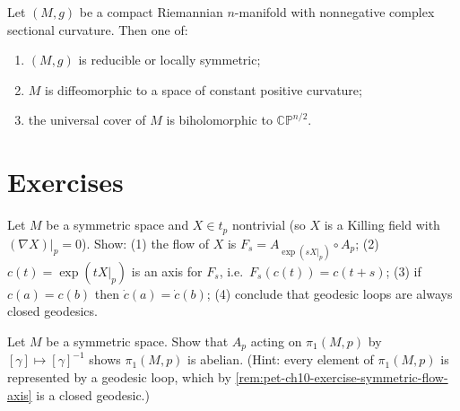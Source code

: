 \begin{theorem}
  \label{thm:pet-ch10-brendle-schoen}
  Let $(M,g)$ be a compact Riemannian $n$-manifold with nonnegative complex
  sectional curvature. Then one of:
  \begin{enumerate}
    \item[(a)] $(M,g)$ is reducible or locally symmetric;
    \item[(b)] $M$ is diffeomorphic to a space of constant positive curvature;
    \item[(c)] the universal cover of $M$ is biholomorphic to $\mathbb{CP}^{n/2}$.
  \end{enumerate}
\end{theorem}

\section{Exercises}

\begin{remark}
  \label{rem:pet-ch10-exercise-symmetric-flow-axis}
  Let $M$ be a symmetric space and $X\in t_p$ nontrivial (so $X$ is a Killing
  field with $(\nabla X)|_p=0$). Show: (1) the flow of $X$ is
  $F_s=A_{\exp(sX|_p)}\circ A_p$; (2) $c(t)=\exp(tX|_p)$ is an axis for $F_s$,
  i.e.\ $F_s(c(t))=c(t+s)$; (3) if $c(a)=c(b)$ then $\dot c(a)=\dot c(b)$;
  (4) conclude that geodesic loops are always closed geodesics.
\end{remark}

\begin{remark}
  \label{rem:pet-ch10-exercise-pi1-abelian}
  Let $M$ be a symmetric space. Show that $A_p$ acting on $\pi_1(M,p)$ by
  $[\gamma]\mapsto[\gamma]^{-1}$ shows $\pi_1(M,p)$ is abelian. (Hint: every
  element of $\pi_1(M,p)$ is represented by a geodesic loop, which by
  \cref{rem:pet-ch10-exercise-symmetric-flow-axis} is a closed geodesic.)
\end{remark}

